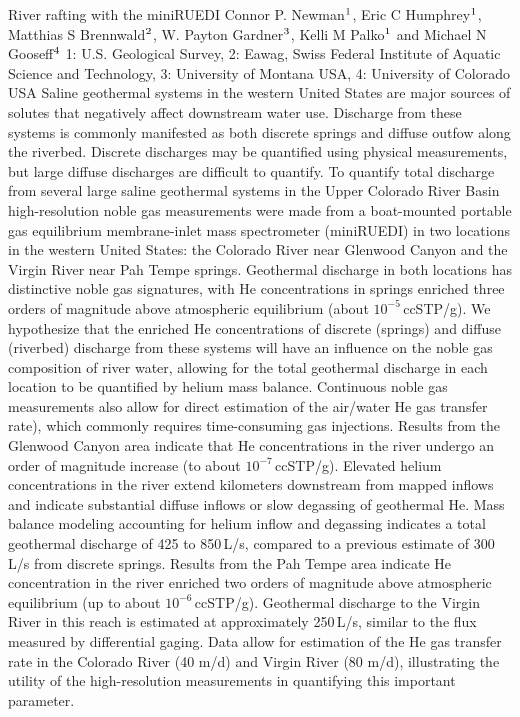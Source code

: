 \begin{conf-abstract}
{River rafting with the miniRUEDI}
{Connor P. Newman$\textsuperscript{1}$, Eric C Humphrey$\textsuperscript{1}$, Matthias S Brennwald$\textsuperscript{2}$, W. Payton Gardner$\textsuperscript{3}$, Kelli M Palko$\textsuperscript{1}$ and Michael N Gooseff$\textsuperscript{4}$}
{1: U.S. Geological Survey, 2: Eawag, Swiss Federal Institute of Aquatic Science and Technology, 3: University of Montana USA, 4: University of Colorado USA}
{Saline geothermal systems in the western United States are major sources of solutes that negatively affect downstream water use. Discharge from these systems is commonly manifested as both discrete springs and diffuse outfow along the riverbed. Discrete discharges may be quantified using physical measurements, but large diffuse discharges are difficult to quantify. To quantify total discharge from several large saline geothermal systems in the Upper Colorado River Basin high-resolution noble gas measurements were made from a boat-mounted portable gas equilibrium membrane-inlet mass spectrometer (miniRUEDI) in two locations in the western United States: the Colorado River near Glenwood Canyon and the Virgin River near Pah Tempe springs. Geothermal discharge in both locations has distinctive noble gas signatures, with He concentrations in springs enriched three orders of magnitude above atmospheric equilibrium (about $10^{-5}$\,ccSTP/g). We hypothesize that the enriched He concentrations of discrete (springs) and diffuse (riverbed) discharge from these systems will have an influence on the noble gas composition of river water, allowing for the total geothermal discharge in each location to be quantified by helium mass balance. Continuous noble gas measurements also allow for direct estimation of the air/water He gas transfer rate), which commonly requires time-consuming gas injections. Results from the Glenwood Canyon area indicate that He concentrations in the river undergo an order of magnitude increase (to about $10^{-7}$\,ccSTP/g). Elevated helium concentrations in the river extend kilometers downstream from mapped inflows and indicate substantial diffuse inflows or slow degassing of geothermal He. Mass balance modeling accounting for helium inflow and degassing indicates a total geothermal discharge of 425 to 850\,L/s, compared to a previous estimate of 300\,L/s from discrete springs. Results from the Pah Tempe area indicate He concentration in the river enriched two orders of magnitude above atmospheric equilibrium (up to about $10^{-6}$\,ccSTP/g). Geothermal discharge to the Virgin River in this reach is estimated at approximately 250\,L/s, similar to the flux measured by differential gaging. Data allow for estimation of the He gas transfer rate in the Colorado River (40 m/d) and Virgin River (80 m/d), illustrating the utility of the high-resolution measurements in quantifying this important parameter.}
\end{conf-abstract}
